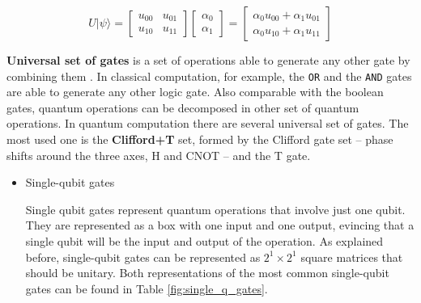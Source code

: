 \begin{itemize}
\begin{equation}
\label{eq:org8a20358}
U |\psi\rangle=\begin{bmatrix}u_{00}&u_{01}\\u_{10}&u_{11}\end{bmatrix} \begin{bmatrix}\alpha_0 \\ \alpha_1 \end{bmatrix} = \begin{bmatrix}\alpha_0 u_{00} + \alpha_1 u_{01} \\ \alpha_0 u_{10} + \alpha_1 u_{11} \end{bmatrix}
\end{equation}

\textbf{Universal set of gates} is a set of operations able to generate any other gate by combining them \cite{Nielsen_2009}.
In classical computation, for example, the \texttt{OR} and the \texttt{AND} gates are able to generate any other logic gate.
Also comparable with the boolean gates, quantum operations can be decomposed in other set of quantum operations.
In quantum computation there are several universal set of gates.
The most used one is the \textbf{Clifford+T} set, formed by the Clifford gate set -- phase shifts around the three axes, H and CNOT -- and the T gate.

\begin{itemize}
\item Single-qubit gates
\label{sec:org008f6da}

Single qubit gates represent quantum operations that involve just one qubit.
They are represented as a box with one input and one output, evincing that a single qubit will be the input and output of the operation.
As explained before, single-qubit gates can be represented as \(2^1 \times 2^1\) square matrices that should be unitary.
Both representations of the most common single-qubit gates can be found in Table \ref{fig:single_q_gates}.


\end{itemize}
\end{itemize}
